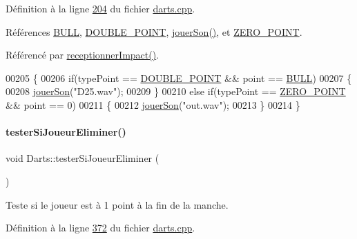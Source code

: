 Définition à la ligne \hyperlink{darts_8cpp_source_l00204}{204} du fichier \hyperlink{darts_8cpp_source}{darts.\+cpp}.



Références \hyperlink{darts_8h_source_l00022}{B\+U\+LL}, \hyperlink{darts_8h_source_l00019}{D\+O\+U\+B\+L\+E\+\_\+\+P\+O\+I\+NT}, \hyperlink{class_darts_a87995841c66fc321b63c28fa8a786347}{jouer\+Son()}, et \hyperlink{darts_8h_source_l00021}{Z\+E\+R\+O\+\_\+\+P\+O\+I\+NT}.



Référencé par \hyperlink{darts_8cpp_source_l00223}{receptionner\+Impact()}.


\begin{DoxyCode}
00205 \{
00206     \textcolor{keywordflow}{if}(typePoint == \hyperlink{darts_8h_af67ad443603f4dddf225d062757614ca}{DOUBLE\_POINT} && point == \hyperlink{darts_8h_ac26e54839269cea6c170f2699af4ead2}{BULL})
00207     \{
00208         \hyperlink{class_darts_a87995841c66fc321b63c28fa8a786347}{jouerSon}(\textcolor{stringliteral}{"D25.wav"});
00209     \}
00210     \textcolor{keywordflow}{else} \textcolor{keywordflow}{if}(typePoint == \hyperlink{darts_8h_a02bea0ce22b1e13c5065f434182317fb}{ZERO\_POINT} && point == 0)
00211     \{
00212         \hyperlink{class_darts_a87995841c66fc321b63c28fa8a786347}{jouerSon}(\textcolor{stringliteral}{"out.wav"});
00213     \}
00214 \}
\end{DoxyCode}
\mbox{\label{class_darts_a0b01c46befe8ee6c1c61b79b0fd817f8}} 
\paragraph{\texorpdfstring{tester\+Si\+Joueur\+Eliminer()}{testerSiJoueurEliminer()}}
{\footnotesize\ttfamily void Darts\+::tester\+Si\+Joueur\+Eliminer (\begin{DoxyParamCaption}{ }\end{DoxyParamCaption})\hspace{0.3cm}{\ttfamily [private]}}



Teste si le joueur est à 1 point à la fin de la manche. 



Définition à la ligne \hyperlink{darts_8cpp_source_l00372}{372} du fichier \hyperlink{darts_8cpp_source}{darts.\+cpp}.




